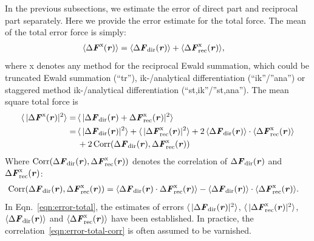 \documentclass[aps,pre,preprint,unsortedaddress]{revtex4}
\renewcommand{\v}[1]{\textbf{\textit{#1}}}
\begin{document}
In the previous subsections, we estimate the error of direct part and
reciprocal part separately. Here we provide the error estimate for the
total force. The mean of the total error force is simply:
\begin{align}
  \langle\Delta\v F^{\textrm{x}}(\v r) \rangle
  &=
  \langle\Delta\v F_{\textrm{dir}}(\v r) \rangle +
  \langle\Delta\v F^{\textrm{x}}_{\textrm{rec}}(\v r) \rangle,
\end{align}
where \textrm{x}
denotes any method for the reciprocal Ewald summation, which
could be truncated Ewald summation (``tr''), ik-/analytical differentiation
(``ik''/''ana'') or staggered method
ik-/analytical differentiation (``st,ik''/''st,ana'').
The mean square total force is
\begin{align}\nonumber
  \langle\,\vert\Delta\v F^{\textrm{x}}(\v r)\vert^2\rangle
  = \,&
  \langle\,\vert
  \Delta\v F_{\textrm{dir}}(\v r) + \Delta\v F^{\textrm{x}}_{\textrm{rec}}(\v r) 
  \vert^2 \rangle \\\nonumber
  = \,&
  \langle\,\vert\Delta\v F_{\textrm{dir}}(\v r)\vert^2\rangle +
  \langle\,\vert\Delta\v F^{\textrm{x}}_{\textrm{rec}}(\v r)\vert^2\rangle +
  2\,\langle\Delta\v F_{\textrm{dir}}(\v r)\rangle
  \cdot \langle\Delta\v F^{\textrm{x}}_{\textrm{rec}}(\v r)\rangle \\
  \label{eqn:error-total}
  &
  + 2\,\textrm{Corr}(\Delta\v F_{\textrm{dir}}(\v r),
  \Delta\v F^{\textrm{x}}_{\textrm{rec}}(\v r))
\end{align}
Where $ \textrm{Corr}(\Delta\v F_{\textrm{dir}}(\v r), \Delta\v
F^{\textrm{x}}_{\textrm{rec}}(\v r))$ denotes the correlation of
$\Delta\v F_{\textrm{dir}}(\v r)$ and $\Delta\v
F^{\textrm{x}}_{\textrm{rec}}(\v r)$:
\begin{align}\label{eqn:error-total-corr}
  \textrm{Corr}(\Delta\v F_{\textrm{dir}}(\v r),
  \Delta\v F^{\textrm{x}}_{\textrm{rec}}(\v r))
  & =
  \langle
  \Delta\v F_{\textrm{dir}}(\v r)\cdot
  \Delta\v F^{\textrm{x}}_{\textrm{rec}}(\v r)
  \rangle -
  \langle
  \Delta\v F_{\textrm{dir}}(\v r)
  \rangle\cdot
  \langle
  \Delta\v F^{\textrm{x}}_{\textrm{rec}}(\v r)
  \rangle.
\end{align}
In Eqn.~\eqref{eqn:error-total}, the estimates of errors
$\langle\,\vert\Delta\v F_{\textrm{dir}}(\v r)\vert^2\rangle $,
$\langle\,\vert\Delta\v F^{\textrm{x}}_{\textrm{rec}}(\v
r)\vert^2\rangle $, $\langle\Delta\v F_{\textrm{dir}}(\v
r)\rangle$ and $\langle\Delta\v F^{\textrm{x}}_{\textrm{rec}}(\v
r)\rangle $ have been established.
In practice, the correlation~\eqref{eqn:error-total-corr}
is often assumed to be varnished.
\end{document}
